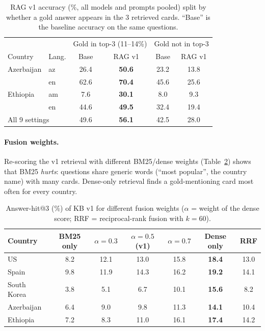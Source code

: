 \documentclass[11pt]{article}
\begin{document}
\begin{table}[h]
\centering
\caption{RAG v1 accuracy (\%, all models and prompts pooled) split by whether a gold answer appears
in the 3 retrieved cards. ``Base'' is the baseline accuracy on the same questions.}
\label{tab:hitsplit}
\begin{tabular}{ll|cc|cc}
\toprule
 & & \multicolumn{2}{c|}{Gold in top-3 (11--14\%)} & \multicolumn{2}{c}{Gold not in top-3} \\
Country & Lang. & Base & RAG v1 & Base & RAG v1 \\
\midrule
Azerbaijan & az & 26.4 & \textbf{50.6} & 23.2 & 13.8 \\
           & en & 62.6 & \textbf{70.4} & 45.6 & 25.6 \\
Ethiopia   & am &  7.6 & \textbf{30.1} &  8.0 &  9.3 \\
           & en & 44.6 & \textbf{49.5} & 32.4 & 19.4 \\
\midrule
\multicolumn{2}{l|}{All 9 settings} & 49.6 & \textbf{56.1} & 42.5 & 28.0 \\
\bottomrule
\end{tabular}
\end{table}

\paragraph{Fusion weights.} Re-scoring the v1 retrieval with different BM25/dense weights
(Table~\ref{tab:sweep}) shows that BM25 \emph{hurts}: questions share generic words
(``most popular'', the country name) with many cards. Dense-only retrieval finds a gold-mentioning
card most often for every country.

\begin{table}[h]
\centering
\caption{Answer-hit@3 (\%) of KB v1 for different fusion weights ($\alpha$ = weight of the dense
score; RRF = reciprocal-rank fusion with $k{=}60$).}
\label{tab:sweep}
\begin{tabular}{lcccccc}
\toprule
Country & BM25 only & $\alpha{=}0.3$ & $\alpha{=}0.5$ (v1) & $\alpha{=}0.7$ & Dense only & RRF \\
\midrule
US          &  8.2 & 12.1 & 13.0 & 15.8 & \textbf{18.4} & 13.0 \\
Spain       &  9.8 & 11.9 & 14.3 & 16.2 & \textbf{19.2} & 14.1 \\
South Korea &  3.8 &  5.1 &  6.7 & 10.1 & \textbf{15.6} &  8.2 \\
Azerbaijan  &  6.4 &  9.0 &  9.8 & 11.3 & \textbf{14.1} & 10.4 \\
Ethiopia    &  7.2 &  8.3 & 11.0 & 16.1 & \textbf{17.4} & 14.2 \\
\bottomrule
\end{tabular}
\end{table}
\end{document}
